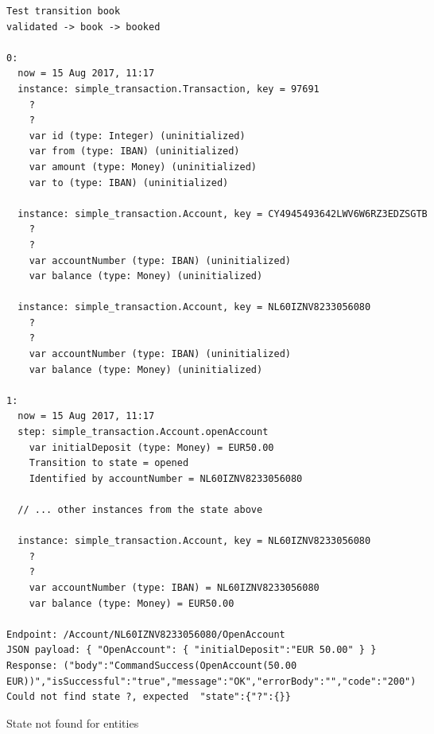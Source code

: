 \begin{sourcecode}[h!]
\begin{lstlisting}[]
Test transition book
validated -> book -> booked

0:
  now = 15 Aug 2017, 11:17
  instance: simple_transaction.Transaction, key = 97691
    ?
    ?
    var id (type: Integer) (uninitialized)
    var from (type: IBAN) (uninitialized)
    var amount (type: Money) (uninitialized)
    var to (type: IBAN) (uninitialized)

  instance: simple_transaction.Account, key = CY4945493642LWV6W6RZ3EDZSGTB
    ?
    ?
    var accountNumber (type: IBAN) (uninitialized)
    var balance (type: Money) (uninitialized)

  instance: simple_transaction.Account, key = NL60IZNV8233056080
    ?
    ?
    var accountNumber (type: IBAN) (uninitialized)
    var balance (type: Money) (uninitialized)

1:
  now = 15 Aug 2017, 11:17
  step: simple_transaction.Account.openAccount
    var initialDeposit (type: Money) = EUR50.00
    Transition to state = opened
    Identified by accountNumber = NL60IZNV8233056080

  // ... other instances from the state above
  
  instance: simple_transaction.Account, key = NL60IZNV8233056080
    ?
    ?
    var accountNumber (type: IBAN) = NL60IZNV8233056080
    var balance (type: Money) = EUR50.00

Endpoint: /Account/NL60IZNV8233056080/OpenAccount
JSON payload: { "OpenAccount": { "initialDeposit":"EUR 50.00" } }
Response: ("body":"CommandSuccess(OpenAccount(50.00 EUR))","isSuccessful":"true","message":"OK","errorBody":"","code":"200")
Could not find state ?, expected  "state":{"?":{}}
\end{lstlisting}
\caption{State not found for entities}
\label{fig:result-not-found-state}
\end{sourcecode}

